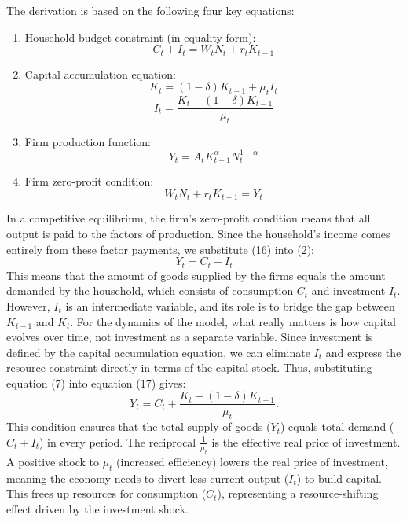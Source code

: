 \documentclass[12pt]{article}
\begin{document}
The derivation is based on the following four key equations:

\begin{enumerate}
    \item {Household budget constraint (in equality form):}
    \begin{equation}
    C_t + I_t = W_t N_t + r_t K_{t-1}
    \tag{2}
    \end{equation}

    \item {Capital accumulation equation:}
    \begin{equation}
    K_t = (1-\delta) K_{t-1} + \mu_t I_t
    \tag{3}
    \end{equation}
    \begin{equation}
I_t = \frac{K_t - (1-\delta)K_{t-1}}{\mu_t}
\tag{7}
    \end{equation}

    \item {Firm production function:}
    \begin{equation}
    Y_t = A_t K_{t-1}^{\alpha} N_t^{1-\alpha}
    \tag{5}
    \end{equation}

    \item {Firm zero-profit condition:}
    \begin{equation}
    W_t N_t + r_t K_{t-1} = Y_t
    \tag{16}
    \end{equation}
\end{enumerate}

In a competitive equilibrium, the firm’s zero-profit condition means that all output is paid to the factors of production. Since the household’s income comes entirely from these factor payments, we substitute (16) into (2):
\begin{equation}
Y_t = C_t + I_t
\tag{17}
\end{equation}
This means that the amount of goods supplied by the firms equals the amount demanded by the household, which consists of consumption $C_t$ and investment $I_t$.
However, $I_t$ is an intermediate variable, and its role is to bridge the gap between $K_{t-1}$ and $K_t$. For the dynamics of the model, what really matters is how capital evolves over time, not investment as a separate variable. Since investment is defined by the capital accumulation equation, we can eliminate $I_t$ and express the resource constraint directly in terms of the capital stock.
Thus, substituting equation (7) into equation (17) gives:
\begin{equation}
Y_t = C_t + \frac{K_t - (1-\delta)K_{t-1}}{\mu_t}.
\tag{18}
\end{equation}
This condition ensures that the total supply of goods ($Y_t$) equals total demand ($C_t + I_t$) in every period.
The reciprocal $\frac{1}{\mu_t}$ is the effective real price of investment. A positive shock to $\mu_t$ (increased efficiency) lowers the real price of investment, meaning the economy needs to divert less current output ($I_t$) to build capital. This frees up resources for consumption ($C_t$), representing a resource-shifting effect driven by the investment shock.
\end{document}
